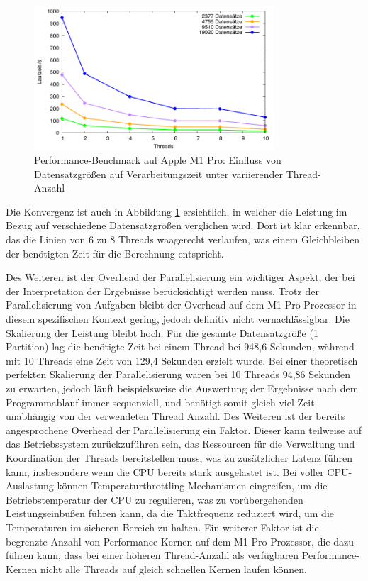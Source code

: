 \begin{figure}[htbp!]
\centering
\includegraphics[width=0.8\textwidth]{../results/plots/m1pro/comp_all_partitions.pdf}
\caption{Performance-Benchmark auf Apple M1 Pro: Einfluss von Datensatzgrößen auf Verarbeitungszeit unter variierender Thread-Anzahl}
\label{fig:m1pro_benchmark_partitions}
\end{figure}

Die Konvergenz ist auch in Abbildung \ref{fig:m1pro_benchmark_partitions} ersichtlich, in welcher die Leistung im Bezug auf verschiedene Datensatzgrößen verglichen wird. Dort ist klar erkennbar, das die Linien von 6 zu 8 Threads waagerecht verlaufen, was einem Gleichbleiben der benötigten Zeit für die Berechnung entspricht.

Des Weiteren ist der Overhead der Parallelisierung ein wichtiger Aspekt, der bei der Interpretation der Ergebnisse berücksichtigt werden muss. Trotz der Parallelisierung von Aufgaben bleibt der Overhead auf dem M1 Pro-Prozessor in diesem spezifischen Kontext gering, jedoch definitiv nicht vernachlässigbar. Die Skalierung der Leistung bleibt hoch. Für die gesamte Datensatzgröße (1 Partition) lag die benötigte Zeit bei einem Thread bei 948,6 Sekunden, während mit 10 Threads eine Zeit von 129,4 Sekunden erzielt wurde. Bei einer theoretisch perfekten Skalierung der Parallelisierung wären bei 10 Threads 94,86 Sekunden zu erwarten, jedoch läuft beispielsweise die Auswertung der Ergebnisse nach dem Programmablauf immer sequenziell, und benötigt somit gleich viel Zeit unabhängig von der verwendeten Thread Anzahl. Des Weiteren ist der bereits angesprochene Overhead der Parallelisierung ein Faktor. Dieser kann teilweise auf das Betriebssystem zurückzuführen sein, das Ressourcen für die Verwaltung und Koordination der Threads bereitstellen muss, was zu zusätzlicher Latenz führen kann, insbesondere wenn die CPU bereits stark ausgelastet ist. Bei voller CPU-Auslastung können Temperaturthrottling-Mechanismen eingreifen, um die Betriebstemperatur der CPU zu regulieren, was zu vorübergehenden Leistungseinbußen führen kann, da die Taktfrequenz reduziert wird, um die Temperaturen im sicheren Bereich zu halten. Ein weiterer Faktor ist die begrenzte Anzahl von Performance-Kernen auf dem M1 Pro Prozessor, die dazu führen kann, dass bei einer höheren Thread-Anzahl als verfügbaren Performance-Kernen nicht alle Threads auf gleich schnellen Kernen laufen können.

